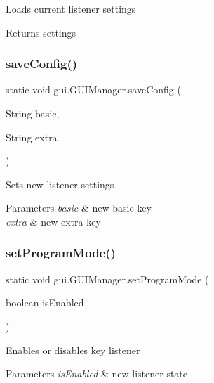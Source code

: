 Loads current listener settings \begin{DoxyReturn}{Returns}
settings 
\end{DoxyReturn}
\mbox{\label{classgui_1_1_g_u_i_manager_a7b6597e10beb5cade7d7333e781ddaed}} 
\subsubsection{\texorpdfstring{save\+Config()}{saveConfig()}}
{\footnotesize\ttfamily static void gui.\+G\+U\+I\+Manager.\+save\+Config (\begin{DoxyParamCaption}\item[{String}]{basic,  }\item[{String}]{extra }\end{DoxyParamCaption})\hspace{0.3cm}{\ttfamily [static]}}

Sets new listener settings 
\begin{DoxyParams}{Parameters}
{\em basic} & new basic key \\
\hline
{\em extra} & new extra key \\
\hline
\end{DoxyParams}
\mbox{\label{classgui_1_1_g_u_i_manager_a2fda83994d697d912245b9be520a57a1}} 
\subsubsection{\texorpdfstring{set\+Program\+Mode()}{setProgramMode()}}
{\footnotesize\ttfamily static void gui.\+G\+U\+I\+Manager.\+set\+Program\+Mode (\begin{DoxyParamCaption}\item[{boolean}]{is\+Enabled }\end{DoxyParamCaption})\hspace{0.3cm}{\ttfamily [static]}}

Enables or disables key listener 
\begin{DoxyParams}{Parameters}
{\em is\+Enabled} & new listener state \\
\hline
\end{DoxyParams}
\mbox{\label{classgui_1_1_g_u_i_manager_a535ab6d04abe06fab3dd346a66680f02}} 
